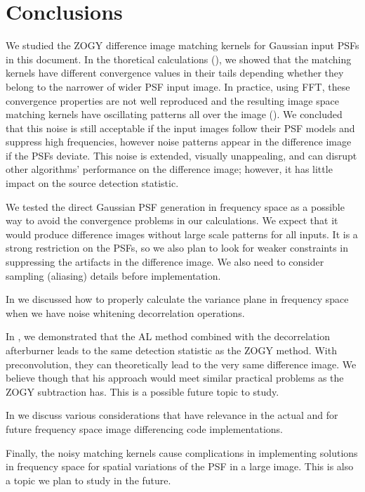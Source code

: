 \section{Conclusions}
%
\par We studied the ZOGY difference image matching kernels for Gaussian
input PSFs in this document. In the thoretical calculations
(), we showed that the matching kernels have different
convergence values in their tails depending whether they belong to the
narrower of wider PSF input image. In practice, using FFT, these convergence
properties are not well reproduced and the resulting image space matching
kernels have oscillating patterns all over the image
(). We concluded that this noise is still acceptable if
the input images follow their PSF models and suppress high frequencies,
however noise patterns appear in the difference image if the PSFs
deviate. This noise is extended, visually unappealing, and can disrupt other
algorithms' performance on the difference image; however, it has little
impact on the source detection statistic.
%
\par We tested the direct Gaussian PSF generation in frequency space as a
possible way to avoid the convergence problems in our calculations. We
expect that it would produce difference images without large scale patterns
for all inputs. It is a strong restriction on the PSFs, so we also plan to
look for weaker constraints in suppressing the artifacts in the difference
image. We also need to consider sampling (aliasing) details before
implementation.
%
\par In  we discussed how to properly calculate the variance
plane in frequency space when we have noise whitening decorrelation
operations.
%
\par In , we demonstrated that the AL method combined with
the decorrelation afterburner leads to the same detection statistic as the
ZOGY method. With preconvolution, they can theoretically lead to the very
same difference image. We believe though that his approach would meet
similar practical problems as the ZOGY subtraction has. This is a possible
future topic to study.
%
\par In  we discuss various considerations that have
relevance in the actual and for future frequency space image differencing
code implementations.
%
\par Finally, the noisy matching kernels cause complications in
implementing solutions in frequency space for spatial variations of the PSF
in a large image. This is also a topic we plan to study in the future.

